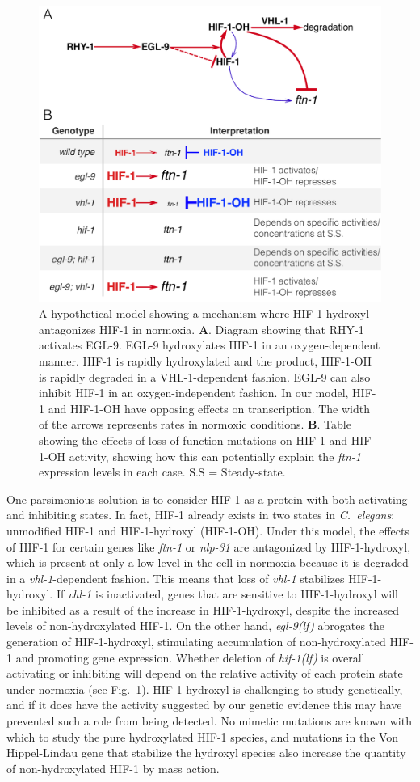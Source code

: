 \documentclass[9pt,twocolumn,twoside]{pnas-new}
\newcommand{\cel}{\emph{C.~elegans}}
\newcommand{\gene}[1]{\mbox{\emph{#1}}}
\newcommand{\nlp}{\gene{nlp-31}}
\newcommand{\ftna}{\gene{ftn-1}}
\newcommand{\egl}{\gene{egl-9(lf)}}
\newcommand{\hif}{\gene{hif-1(lf)}}
\newcommand{\hifp}{HIF-1}
\begin{document}
\begin{figure}[tbhp]
  \centering
  \includegraphics[width=.5\textwidth]{../figs/hif1oh_model.pdf}
  \caption{
    A hypothetical model showing a mechanism where \hifp{}-hydroxyl antagonizes
    \hifp{} in normoxia. \textbf{A}. Diagram showing that RHY-1 activates EGL-9.
    EGL-9 hydroxylates HIF-1 in an oxygen-dependent manner. HIF-1 is
    rapidly hydroxylated and the product, HIF-1-OH is rapidly degraded in a
    VHL-1-dependent fashion. EGL-9 can also inhibit
    HIF-1 in an oxygen-independent fashion. In our model, HIF-1 and HIF-1-OH
    have opposing effects on transcription. The width of the arrows represents
    rates in normoxic conditions.
    \textbf{B}. Table showing the effects of loss-of-function mutations on HIF-1
    and HIF-1-OH activity, showing how this can potentially explain the
    \gene{ftn-1} expression levels in each case. S.S = Steady-state.
  }
\label{fig:hif1oh_table}
\end{figure}

One parsimonious solution is to consider \hifp{} as a protein with both
activating and inhibiting states. In fact, \hifp{} already exists in two states
in \cel{}: unmodified \hifp{} and \hifp{}-hydroxyl (\hifp{}-OH). Under this
model, the effects of \hifp{} for certain genes like \ftna{} or \nlp{} are
antagonized by \hifp{}-hydroxyl, which is present at only a low level in the
cell in normoxia because it is degraded in a \gene{vhl-1}-dependent fashion.
This means that loss of \gene{vhl-1} stabilizes \hifp{}-hydroxyl. If \gene{vhl-1}
is inactivated, genes that are
sensitive to \hifp{}-hydroxyl will be inhibited as a result of the increase in
\hifp{}-hydroxyl, despite the increased levels of
non-hydroxylated \hifp{}. On the other hand, \egl{}
abrogates the generation of \hifp{}-hydroxyl, stimulating accumulation of
non-hydroxylated \hifp{} and promoting gene expression. Whether deletion of \hif{}
is overall activating or inhibiting will depend on the relative activity of each
protein state under normoxia (see Fig.~\ref{fig:hif1oh_table}). \hifp{}-hydroxyl
is challenging to study genetically, and if it does have the activity suggested
by our genetic evidence this may have prevented such a role from being detected.
No mimetic mutations are known with which to study the pure
hydroxylated \hifp{} species, and mutations in the Von Hippel-Lindau gene that
stabilize the hydroxyl species also increase the quantity of non-hydroxylated
\hifp{} by mass action.
\end{document}
